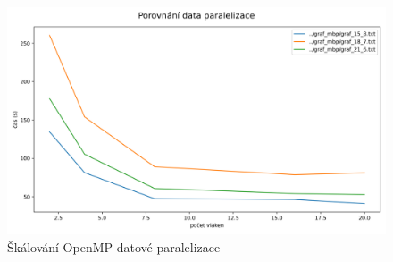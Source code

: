 \begin{figure}[!htbp]
\centerline{\includegraphics[scale=.46]{images/porovnání_data_paralelizace.png}}
\caption{Škálování OpenMP datové paralelizace}
\end{figure}
\FloatBarrier